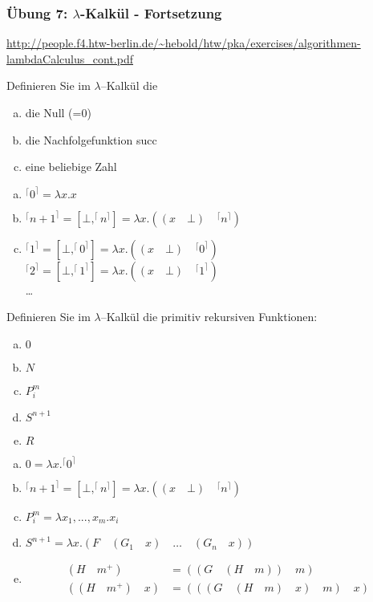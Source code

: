 \begin{card}
	\frametitle{Übung 7: $\lambda$-Kalkül - Fortsetzung}
	\url{http://people.f4.htw-berlin.de/~hebold/htw/pka/exercises/algorithmen-lambdaCalculus_cont.pdf}
\end{card}

\begin{card}
	Definieren Sie im $\lambda$–Kalkül die
	\begin{enumerate}[a)]
    \item die Null (=0)
    \item die Nachfolgefunktion succ
    \item eine beliebige Zahl
	\end{enumerate}
	\hr
	\begin{enumerate}[a)]
    \item $^\lceil 0 ^\rceil = \lambda x.x$
    \item $^\lceil n+1 ^\rceil = [\bot, ^\lceil n ^\rceil] = \lambda x.((x \quad \bot) \quad ^\lceil n ^\rceil)$
    \item $^\lceil 1 ^\rceil = [\bot, ^\lceil 0 ^\rceil] = \lambda x.((x \quad \bot) \quad ^\lceil 0 ^\rceil)$\\
        $^\lceil 2 ^\rceil = [\bot, ^\lceil 1 ^\rceil] = \lambda x.((x \quad \bot) \quad ^\lceil 1 ^\rceil)$\\
        \dots
	\end{enumerate}
\end{card}

\begin{card}
	Definieren Sie im $\lambda$–Kalkül die primitiv rekursiven Funktionen:
	\begin{enumerate}[a)]
    \item $0$
    \item $N$
    \item $P^m_i$
    \item $S^{n+1}$
    \item $R$
	\end{enumerate}
	\hr
	\begin{enumerate}[a)]
    \item $0 = \lambda x.^\lceil 0 ^\rceil$
    \item $^\lceil n+1 ^\rceil = [\bot, ^\lceil n ^\rceil] = \lambda x.((x \quad \bot) \quad ^\lceil n ^\rceil)$\\
    \item $P^m_i = \lambda x_1,...,x_m.x_i$
    \item $S^{n+1} = \lambda x.(F \quad (G_1 \quad x) \quad \ldots \quad (G_n \quad x))$
    \item
      \begin{align*}
        (H \quad m^+) &= ((G \quad (H \quad m)) \quad m) \\
        ((H \quad m^+) \quad x) &= (((G \quad (H \quad m) \quad x) \quad m) \quad x)
      \end{align*}
	\end{enumerate}
\end{card}


